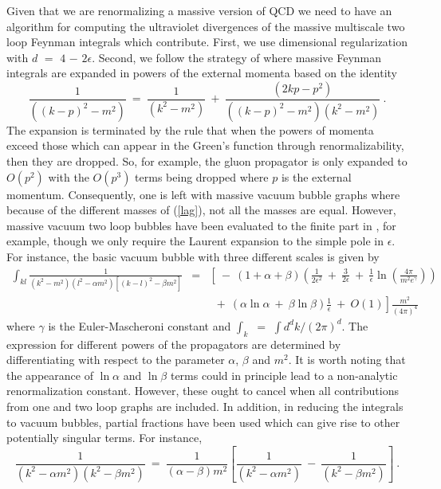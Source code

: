 \documentclass[a4paper,11pt]{article}
\begin{document}
Given that we are renormalizing a massive version of QCD we need to have an
algorithm for computing the ultraviolet divergences of the massive multiscale
two loop Feynman integrals which contribute. First, we use dimensional 
regularization with $d$ $=$ $4$ $-$ $2\epsilon$. Second, we follow the strategy
of \cite{20,21} where massive Feynman integrals are expanded in powers of the
external momenta based on the identity
\begin{equation} 
\frac{1}{((k-p)^2-m^2)} ~=~ \frac{1}{(k^2-m^2)} ~+~ \frac{(2kp - p^2)}
{((k-p)^2-m^2)(k^2-m^2)} ~.  
\end{equation} 
The expansion is terminated by the rule that when the powers of momenta exceed 
those which can appear in the Green's function through renormalizability, then 
they are dropped. So, for example, the gluon propagator is only expanded to 
$O(p^2)$ with the $O(p^3)$ terms being dropped where $p$ is the external 
momentum. Consequently, one is left with massive vacuum bubble graphs where 
because of the different masses of (\ref{lag}), not all the masses are equal. 
However, massive vacuum two loop bubbles have been evaluated to the finite part
in \cite{22}, for example, though we only require the Laurent expansion to the 
simple pole in $\epsilon$. For instance, the basic vacuum bubble with three 
different scales is given by  
\begin{eqnarray} 
\int_{kl} \frac{1}{(k^2-m^2)(l^2-\alpha m^2)[(k-l)^2-\beta m^2]} &=& 
\left[ ~-~ (1 + \alpha + \beta) \left( \frac{1}{2\epsilon^2} ~+~ 
\frac{3}{2\epsilon} ~+~ \frac{1}{\epsilon} \ln \left( \frac{4\pi}{m^2 e^\gamma}
\right) \right) \right. \nonumber \\
&& \left. ~~+~ \left( \alpha \ln \alpha ~+~ \beta \ln \beta \right) 
\frac{1}{\epsilon} ~+~ O(1) \right] \frac{m^2}{(4\pi)^4} 
\end{eqnarray}
where $\gamma$ is the Euler-Mascheroni constant and $\int_k$ $=$ $\int 
d^d k/(2\pi)^d$. The expression for different powers of the propagators are 
determined by differentiating with respect to the parameter $\alpha$, $\beta$
and $m^2$. It is worth noting that the appearance of $\ln \alpha$ and $\ln 
\beta$ terms could in principle lead to a non-analytic renormalization 
constant. However, these ought to cancel when all contributions from one and
two loop graphs are included. In addition, in reducing the integrals to vacuum
bubbles, partial fractions have been used which can give rise to other 
potentially singular terms. For instance, 
\begin{equation} 
\frac{1}{(k^2-\alpha m^2)(k^2-\beta m^2)} ~=~ \frac{1}{(\alpha-\beta)m^2} 
\left[ \frac{1}{(k^2-\alpha m^2)} ~-~ \frac{1}{(k^2- \beta m^2)} \right] ~.  
\end{equation} 
\end{document}
